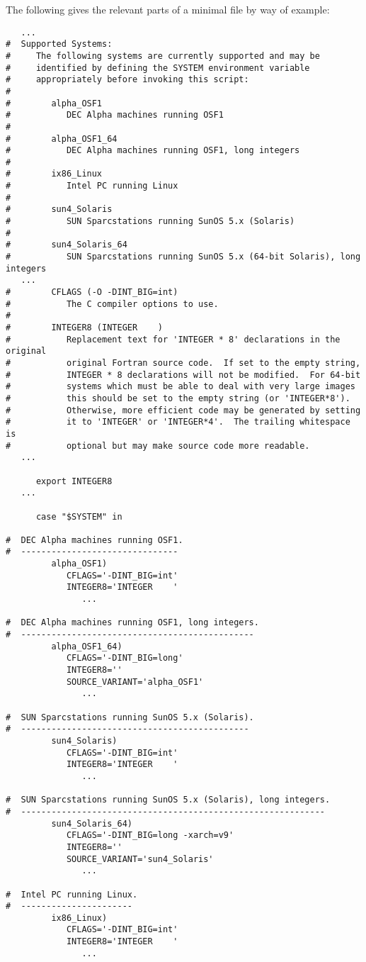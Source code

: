 \documentclass[twoside,11pt]{article}
\renewcommand{\_}{\texttt{\symbol{95}}}
\begin{document}
The following gives the relevant parts of a minimal 
file by way of example:
\begin{squote}
\begin{verbatim}
   ...
#  Supported Systems:
#     The following systems are currently supported and may be
#     identified by defining the SYSTEM environment variable
#     appropriately before invoking this script:
#
#        alpha_OSF1
#           DEC Alpha machines running OSF1
#
#        alpha_OSF1_64
#           DEC Alpha machines running OSF1, long integers
#
#        ix86_Linux
#           Intel PC running Linux
#
#        sun4_Solaris
#           SUN Sparcstations running SunOS 5.x (Solaris)
#
#        sun4_Solaris_64
#           SUN Sparcstations running SunOS 5.x (64-bit Solaris), long integers
   ...
#        CFLAGS (-O -DINT_BIG=int)
#           The C compiler options to use.
#
#        INTEGER8 (INTEGER    )
#           Replacement text for 'INTEGER * 8' declarations in the original
#           original Fortran source code.  If set to the empty string,
#           INTEGER * 8 declarations will not be modified.  For 64-bit
#           systems which must be able to deal with very large images
#           this should be set to the empty string (or 'INTEGER*8').
#           Otherwise, more efficient code may be generated by setting
#           it to 'INTEGER' or 'INTEGER*4'.  The trailing whitespace is
#           optional but may make source code more readable.
   ...

      export INTEGER8
   ...

      case "$SYSTEM" in

#  DEC Alpha machines running OSF1.
#  -------------------------------
         alpha_OSF1)
            CFLAGS='-DINT_BIG=int'
            INTEGER8='INTEGER    '
               ...

#  DEC Alpha machines running OSF1, long integers.
#  ----------------------------------------------
         alpha_OSF1_64)
            CFLAGS='-DINT_BIG=long'
            INTEGER8=''
            SOURCE_VARIANT='alpha_OSF1'
               ...

#  SUN Sparcstations running SunOS 5.x (Solaris).
#  ---------------------------------------------
         sun4_Solaris)
            CFLAGS='-DINT_BIG=int'
            INTEGER8='INTEGER    '
               ...

#  SUN Sparcstations running SunOS 5.x (Solaris), long integers.
#  ------------------------------------------------------------
         sun4_Solaris_64)
            CFLAGS='-DINT_BIG=long -xarch=v9'
            INTEGER8=''
            SOURCE_VARIANT='sun4_Solaris'
               ...

#  Intel PC running Linux.
#  ----------------------
         ix86_Linux)
            CFLAGS='-DINT_BIG=int'
            INTEGER8='INTEGER    '
               ...
\end{verbatim}
\end{squote}
\end{document}
